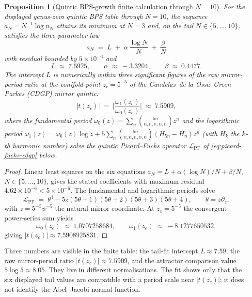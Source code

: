 \documentclass[12pt]{amsart}
\newtheorem{prop}[thm]{Proposition}
\theoremstyle{remark}
\begin{document}
\begin{prop}[Quintic BPS-growth finite calculation through $N=10$]
  \label{prop:chiral-volume-quintic}
  For the displayed genus-zero quintic BPS table through \(N=10\), the
  sequence \(a_N=N^{-1}\log n_N\) attains its minimum at
  \(N=3\) and, on the tail \(N\in\{5,\dots,10\}\), satisfies the
  three-parameter law
  \[
    a_N \;=\; L \;+\; \alpha\,\frac{\log N}{N} \;+\; \frac{\beta}{N}
  \]
  with residual bounded by \(5\times10^{-6}\) and
  \[
    L \;\approx\; 7.5925,\qquad \alpha \;\approx\; -3.3204,
    \qquad \beta \;\approx\; 0.4477.
  \]
  The intercept \(L\) is numerically within three significant figures of the
  raw mirror-period ratio at the conifold point \(z_c=5^{-5}\) of the
  Candelas--de la Ossa--Green--Parkes (CDGP) mirror quintic:
  \[
    |t(z_c)| \;=\;
    \biggl|\frac{\omega_1(z_c)}{\omega_0(z_c)}\biggr|
    \;\approx\; 7.5909,
  \]
  where the fundamental period
  \(\omega_0(z)=\sum_n\binom{5n}{n,n,n,n,n}z^n\) and the logarithmic
  period
  \(\omega_1(z)=\omega_0(z)\log z+5\sum_n\binom{5n}{n,n,n,n,n}(H_{5n}-H_n)z^n\)
  (with \(H_k\) the \(k\)-th harmonic number) solve the quintic
  Picard--Fuchs operator \(\mathcal L_{\mathrm{PF}}\) of
  \eqref{eq:picard-fuchs-cdgp} below.
\end{prop}

\begin{proof}
  Linear least squares on the six equations
  \(a_N=L+\alpha(\log N)/N+\beta/N\), \(N\in\{5,\dots,10\}\), gives the
  stated coefficients with maximum residual
  \(4.62\times10^{-6}<5\times10^{-6}\).  The fundamental and logarithmic
  periods solve
  \begin{equation}\label{eq:picard-fuchs-cdgp}
    \mathcal L_{\mathrm{PF}}\;=\;\theta^4-5z(5\theta+1)(5\theta+2)(5\theta+3)(5\theta+4),
    \qquad \theta=z\partial_z,
  \end{equation}
  with \(z=5^{-5}\psi^{-5}\) the natural mirror coordinate.  At
  \(z_c=5^{-5}\) the convergent power-series sum yields
  \[
    \omega_0(z_c) \;\approx\; 1.0707258684,\qquad
    \omega_1(z_c) \;\approx\; -8.1277650532,
  \]
  giving \(|t(z_c)|\approx 7.5908925831\).
\end{proof}

Three numbers are visible in the finite table: the tail-fit intercept
\(L\approx 7.59\), the raw mirror-period ratio
\(|t(z_c)|\approx 7.5909\), and the attractor comparison value
\(5\log 5\approx 8.05\).  They live in different normalisations.  The
fit shows only that the six displayed tail values are compatible with a
period scale near \(|t(z_c)|\); it does not identify the Abel--Jacobi
normal function.
\end{document}
